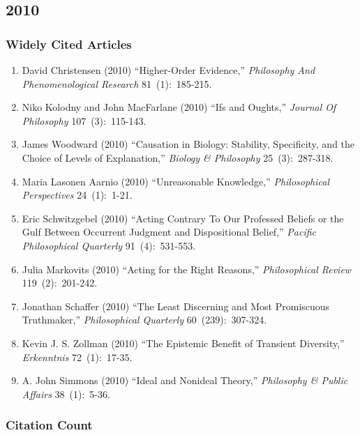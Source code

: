 \documentclass[
  10pt,
  letterpaper,
  DIV=11,
  numbers=noendperiod,
  twoside]{scrartcl}
\providecommand{\tightlist}{%
  \setlength{\itemsep}{0pt}\setlength{\parskip}{0pt}}\usepackage{longtable,booktabs,array}
\begin{document}
\newpage

\subsection{2010}\label{sec-s2010}

\subsubsection*{Widely Cited Articles}\label{widely-cited-articles-54}

\begin{enumerate}
\def\labelenumi{\arabic{enumi}.}
\tightlist
\item
  David Christensen (2010) ``Higher-Order Evidence,'' \emph{Philosophy
  And Phenomenological Research} 81~(1):~185-215.
\item
  Niko Kolodny and John MacFarlane (2010) ``Ifs and Oughts,''
  \emph{Journal Of Philosophy} 107~(3):~115-143.
\item
  James Woodward (2010) ``Causation in Biology: Stability, Specificity,
  and the Choice of Levels of Explanation,'' \emph{Biology \&
  Philosophy} 25~(3):~287-318.
\item
  Maria Lasonen Aarnio (2010) ``Unreasonable Knowledge,''
  \emph{Philosophical Perspectives} 24~(1):~1-21.
\item
  Eric Schwitzgebel (2010) ``Acting Contrary To Our Professed Beliefs or
  the Gulf Between Occurrent Judgment and Dispositional Belief,''
  \emph{Pacific Philosophical Quarterly} 91~(4):~531-553.
\item
  Julia Markovits (2010) ``Acting for the Right Reasons,''
  \emph{Philosophical Review} 119~(2):~201-242.
\item
  Jonathan Schaffer (2010) ``The Least Discerning and Most Promiscuous
  Truthmaker,'' \emph{Philosophical Quarterly} 60~(239):~307-324.
\item
  Kevin J. S. Zollman (2010) ``The Epistemic Benefit of Transient
  Diversity,'' \emph{Erkenntnis} 72~(1):~17-35.
\item
  A. John Simmons (2010) ``Ideal and Nonideal Theory,'' \emph{Philosophy
  \& Public Affairs} 38~(1):~5-36.
\end{enumerate}

\subsubsection*{Citation Count}\label{sec-count-2010}
\end{document}
